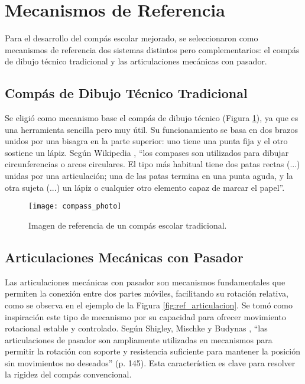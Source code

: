 \documentclass[11pt, a4paper]{article}
\begin{document}
\section{Mecanismos de Referencia}
\label{sec:referencias}
Para el desarrollo del compás escolar mejorado, se seleccionaron como mecanismos de referencia dos sistemas distintos pero complementarios: el compás de dibujo técnico tradicional y las articulaciones mecánicas con pasador.
\bigskip

\subsection{Compás de Dibujo Técnico Tradicional}
Se eligió como mecanismo base el compás de dibujo técnico (Figura \ref{fig:ref_compas}), ya que es una herramienta sencilla pero muy útil. Su funcionamiento se basa en dos brazos unidos por una bisagra en la parte superior: uno tiene una punta fija y el otro sostiene un lápiz.
Según Wikipedia \cite{wikipedia_utensilios}, \enquote{los compases son utilizados para dibujar circunferencias o arcos circulares. El tipo más habitual tiene dos patas rectas (...) unidas por una articulación; una de las patas termina en una punta aguda, y la otra sujeta (...) un lápiz o cualquier otro elemento capaz de marcar el papel}.
\bigskip
\bigskip
\bigskip
\bigskip

\begin{figure}[htbp] %
    \centering
    \texttt{[image: compass\_photo]}
    \caption{Imagen de referencia de un compás escolar tradicional.}
    \label{fig:ref_compas}
\end{figure}
\bigskip


\subsection{Articulaciones Mecánicas con Pasador}
Las articulaciones mecánicas con pasador son mecanismos fundamentales que permiten la conexión entre dos partes móviles, facilitando su rotación relativa, como se observa en el ejemplo de la Figura \ref{fig:ref_articulacion}. Se tomó como inspiración este tipo de mecanismo por su capacidad para ofrecer movimiento rotacional estable y controlado.
Según Shigley, Mischke y Budynas \cite{shigley_design}, \enquote{las articulaciones de pasador son ampliamente utilizadas en mecanismos para permitir la rotación con soporte y resistencia suficiente para mantener la posición sin movimientos no deseados} (p. 145). Esta característica es clave para resolver la rigidez del compás convencional.
\newpage
\end{document}
